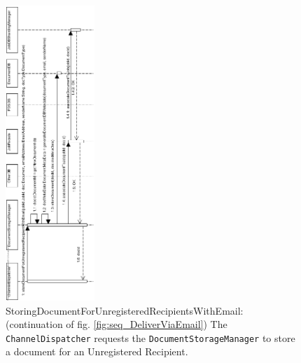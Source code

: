 \documentclass[a4paper,10pt]{article}
\begin{document}
\begin{figure}[!htp]
    \centering
    \includegraphics[width=0.3\textwidth]{StoringDocumentForUnregisteredRecipientsWithEmail.png}
    \caption{StoringDocumentForUnregisteredRecipientsWithEmail: (continuation of fig. \ref{fig:seq_DeliverViaEmail}) The \texttt{ChannelDispatcher} requests the \texttt{DocumentStorageManager} to store a document for an Unregistered Recipient.
        }\label{fig:seq_StoreDocRegisteredRecipient}
\end{figure}
\end{document}
